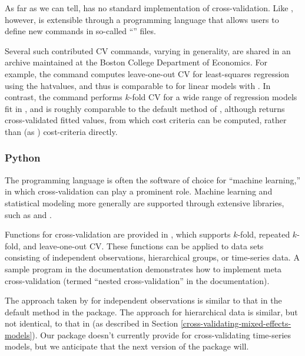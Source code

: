 \documentclass[
]{jss}
\begin{document}
As far as we can tell,  has no standard implementation
of cross-validation. Like , however,  is
extensible through a programming language that allows users to define
new commands in so-called ``'' files.

Several such contributed  CV commands, varying in
generality, are shared in an archive maintained at the Boston College
Department of Economics. For example, the  command
\citep{Rios-Avila:2018} computes leave-one-out CV for least-squares
regression using the hatvalues, and thus is comparable to 
for linear models with . In contrast, the
 command \citep{Schonlau:2020} performs \(k\)-fold
CV for a wide range of regression models fit in , and is
roughly comparable to the default method of , although
 returns cross-validated fitted values, from which
cost criteria can be computed, rather than (as )
cost-criteria directly.

\subsubsection{Python}\label{python}

The programming language  is often the software of
choice for ``machine learning,'' in which cross-validation can play a
prominent role. Machine learning and statistical modeling more generally
are supported through extensive  libraries, such as
\citep{Pedregosa-et-al:2011, ScikitLearnDevelopers:2024} and
 \citep[which isn't limited to use within
]{TensorFlow:2015}.

Functions for cross-validation are provided in , which
supports \(k\)-fold, repeated \(k\)-fold, and leave-one-out CV. These
functions can be applied to data sets consisting of independent
observations, hierarchical groups, or time-series data. A sample program
in the  documentation
\citep{ScikitLearnDevelopers:2024} demonstrates how to implement meta
cross-validation (termed ``nested cross-validation'' in the
documentation).

The approach taken by  for independent observations is
similar to that in the default  method in the 
package. The approach for hierarchical data is similar, but not
identical, to that in  (as described in Section
\ref{cross-validating-mixed-effects-models}). Our  package
doesn't currently provide for cross-validating time-series models, but
we anticipate that the next version of the package will.
\end{document}
